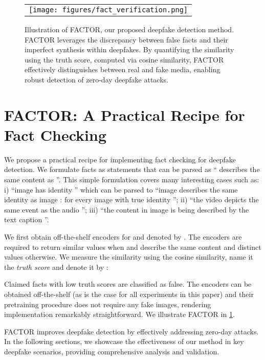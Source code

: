 \documentclass{article} \usepackage{iclr2024_conference,times}
\begin{document}
\begin{figure}[t]
  \begin{center}
    \begin{tabular}{c}
    \texttt{[image: figures/fact\_verification.png]} 
    \end{tabular}
  \end{center}
  \vspace{-0.75em}
    \caption{Illustration of FACTOR, our proposed deepfake detection method. FACTOR leverages the discrepancy between false facts and their imperfect synthesis within deepfakes. By quantifying the similarity using the truth score, computed via cosine similarity, FACTOR effectively distinguishes between real and fake media, enabling robust detection of zero-day deepfake attacks.}
    \label{fig:factor}
\end{figure}


\section{FACTOR: A Practical Recipe for Fact Checking}
\label{sec:framework}

We propose a practical recipe for implementing fact checking for deepfake detection. We formulate facts as statements that can be parsed as “ describes the same content as ”. This simple formulation covers many interesting cases such as: i) “image  has identity ” which can be parsed to “image  describes the same identity as image : for every image  with true identity ”; ii) “the video  depicts the same event as the audio ”; iii) “the content in image  is being described by the text caption ”.    

We first obtain off-the-shelf encoders for  and  denoted by . The encoders are required to return similar values when  and  describe the same content and distinct values otherwise. We measure the similarity using the cosine similarity, name it the \textit{truth score} and denote it by :

Claimed facts with low truth scores are classified as false. The encoders can be obtained off-the-shelf (as is the case for all experiments in this paper) and their pretraining procedure does not require any fake images, rendering implementation remarkably straightforward. We illustrate FACTOR in \cref{fig:factor}.

FACTOR improves deepfake detection by effectively addressing zero-day attacks. In the following sections, we showcase the effectiveness of our method in key deepfake scenarios, providing comprehensive analysis and validation.
\end{document}
